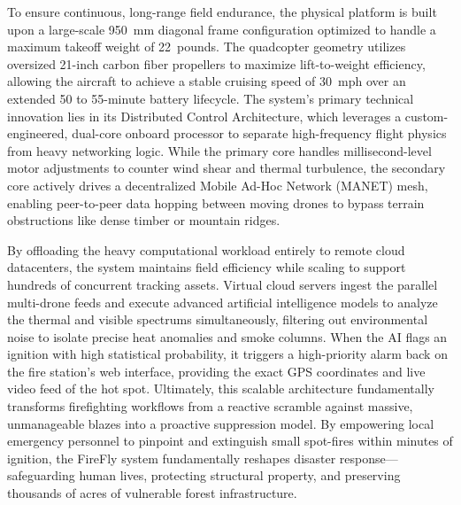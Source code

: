\documentclass[journal, onecolumn]{IEEEtran}
\begin{document}
To ensure continuous, long-range field endurance, the physical platform is built upon a large-scale 950~mm diagonal frame configuration optimized to handle a maximum takeoff weight of 22~pounds. The quadcopter geometry utilizes oversized 21-inch carbon fiber propellers to maximize lift-to-weight efficiency, allowing the aircraft to achieve a stable cruising speed of 30~mph over an extended 50 to 55-minute battery lifecycle. The system's primary technical innovation lies in its Distributed Control Architecture, which leverages a custom-engineered, dual-core onboard processor to separate high-frequency flight physics from heavy networking logic. While the primary core handles millisecond-level motor adjustments to counter wind shear and thermal turbulence, the secondary core actively drives a decentralized Mobile Ad-Hoc Network (MANET) mesh, enabling peer-to-peer data hopping between moving drones to bypass terrain obstructions like dense timber or mountain ridges.

By offloading the heavy computational workload entirely to remote cloud datacenters, the system maintains field efficiency while scaling to support hundreds of concurrent tracking assets. Virtual cloud servers ingest the parallel multi-drone feeds and execute advanced artificial intelligence models to analyze the thermal and visible spectrums simultaneously, filtering out environmental noise to isolate precise heat anomalies and smoke columns. When the AI flags an ignition with high statistical probability, it triggers a high-priority alarm back on the fire station's web interface, providing the exact GPS coordinates and live video feed of the hot spot. Ultimately, this scalable architecture fundamentally transforms firefighting workflows from a reactive scramble against massive, unmanageable blazes into a proactive suppression model. By empowering local emergency personnel to pinpoint and extinguish small spot-fires within minutes of ignition, the FireFly system fundamentally reshapes disaster response—safeguarding human lives, protecting structural property, and preserving thousands of acres of vulnerable forest infrastructure.


\clearpage

\end{document}
